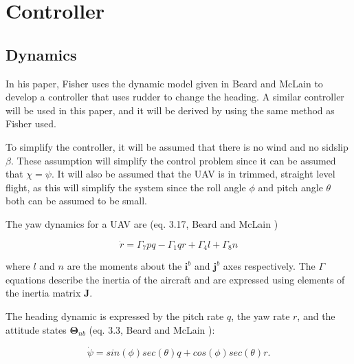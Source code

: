 \section{Controller}

\subsection{Dynamics}
In his paper, Fisher \cite{ratcFISHER} uses the dynamic model given in Beard and McLain \cite{suaBEARD} to develop a controller that uses rudder to change the heading. A similar controller will be used in this paper, and it will be derived by using the same method as Fisher used.

To simplify the controller, it will be assumed that there is no wind and no sidslip $\beta$. These assumption will simplify the control problem since it can be assumed that $\chi = \psi$. It will also be assumed that the UAV is in trimmed, straight level flight, as this will simplify the system since the roll angle $\phi$ and pitch angle $\theta$ both can be assumed to be small.

The yaw dynamics for a UAV are (eq. 3.17, Beard and McLain \cite{suaBEARD})

\begin{equation}
	\dot{r} = \Gamma_7pq - \Gamma_1qr + \Gamma_4l + \Gamma_8n
	\label{eq:yaw_dynamics}
\end{equation}

where $l$ and $n$ are the moments about the $\bm{i}^b$ and $\bm{j}^b$ axes respectively. The $\Gamma$ equations describe the inertia of the aircraft and are expressed using elements of the inertia matrix $\bm{J}$.


The heading dynamic is expressed by the pitch rate $q$, the yaw rate $r$, and the attitude states $\bm{\Theta}_{nb}$ (eq. 3.3, Beard and McLain \cite{suaBEARD}):

\begin{equation}
	\dot{\psi} = sin(\phi)sec(\theta)q + cos(\phi)sec(\theta)r.
\end{equation}

